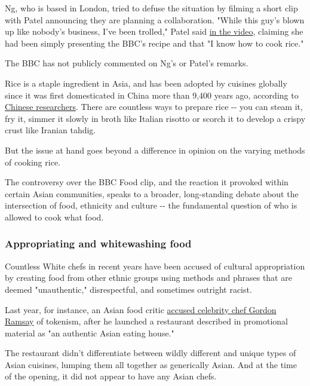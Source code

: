 Ng, who is based in London, tried to defuse the situation by filming a
short clip with Patel announcing they are planning a collaboration.
"While this guy's blown up like nobody's business, I've been trolled,"
Patel said
\href{https://twitter.com/hershapatel1/status/1286794759982522370}{in
the video}, claiming she had been simply presenting the BBC's recipe and
that "I know how to cook rice."

The BBC has not publicly commented on Ng's or Patel's remarks.

Rice is a staple ingredient in Asia, and has been adopted by cuisines
globally since it was first domesticated in China more than 9,400 years
ago, according to
\href{https://phys.org/news/2017-05-domesticated-rice-dated-years-china.html}{Chinese
researchers}. There are countless ways to prepare rice -\/- you can
steam it, fry it, simmer it slowly in broth like Italian risotto or
scorch it to develop a crispy crust like Iranian tahdig.

But the issue at hand goes beyond a difference in opinion on the varying
methods of cooking rice.

The controversy over the BBC Food clip, and the reaction it provoked
within certain Asian communities, speaks to a broader, long-standing
debate about the intersection of food, ethnicity and culture -\/- the
fundamental question of who is allowed to cook what food.

\hypertarget{appropriating-and-whitewashing-food}{%
\subsubsection{Appropriating and whitewashing
food}\label{appropriating-and-whitewashing-food}}

Countless White chefs in recent years have been accused of cultural
appropriation by creating food from other ethnic groups using methods
and phrases that are deemed "unauthentic," disrespectful, and sometimes
outright racist.

Last year, for instance, an Asian food critic
\href{https://www.cnn.com/travel/article/gordon-ramsey-asian-restaurant-cultural-appropriation-intl-scli/index.html}{accused
celebrity chef Gordon Ramsay} of tokenism, after he launched a
restaurant described in promotional material as "an authentic Asian
eating house."

The restaurant didn't differentiate between wildly different and unique
types of Asian cuisines, lumping them all together as generically Asian.
And at the time of the opening, it did not appear to have any Asian
chefs.

